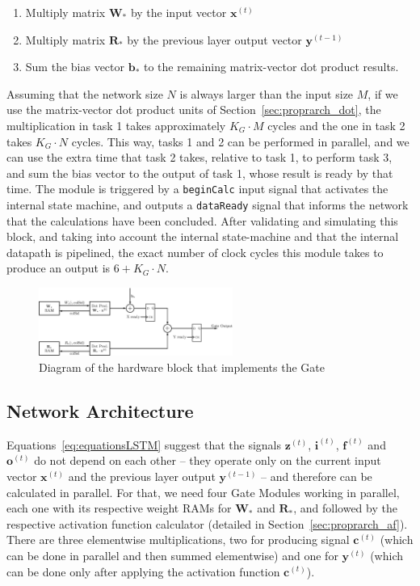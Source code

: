 \documentclass{IEEEtran}
\newcommand{\mb}[1]{\mathbf{#1}}
\begin{document}
\begin{enumerate}
    \item Multiply matrix $\mb{W}_*$ by the input vector $\mb{x}^{(t)}$
    \item Multiply matrix $\mb{R}_*$ by the previous layer output vector $\mb{y}^{(t-1)}$
    \item Sum the bias vector $\mb{b}_*$ to the remaining matrix-vector dot product results.
\end{enumerate}
Assuming that the network size $N$ is always larger than the input size $M$, if we use the matrix-vector dot product units of Section~\ref{sec:proprarch_dot}, the multiplication
in task 1 takes approximately $K_G\cdot M$ cycles and the one in task 2 takes $K_G\cdot N$ cycles. This way, tasks 1 and 2 can be performed in parallel, and we can use the extra
time that task 2 takes, relative to task 1,  to perform task 3, and sum the bias vector to the output of task 1, whose result is ready by that time. The module is triggered by a
\verb+beginCalc+ input signal that activates the internal state machine, and outputs a \verb+dataReady+ signal that informs the network that the calculations have been concluded.
After validating and simulating this block, and taking into account the internal state-machine and that the internal datapath is pipelined, the exact number
of clock cycles this module takes to produce an output is $6+K_G\cdot N$.

\begin{figure}
    \centering
    \includegraphics[width=2.5in]{figures/gate.eps}
    \caption[Diagram of the hardware block that implements the Gate]{Diagram of the hardware block that implements the Gate}
    \label{fig:gate}
\end{figure}

\subsection{Network Architecture}\label{sec:proprarch_net}
Equations~\ref{eq:equationsLSTM} suggest that the signals $\mb{z}^{(t)}$, $\mb{i}^{(t)}$, $\mb{f}^{(t)}$ and $\mb{o}^{(t)}$ do not depend on each other -- they
operate only on the current input vector $\mb{x}^{(t)}$ and the previous layer output $\mb{y}^{(t-1)}$ -- and therefore can be calculated in parallel. For that, we
need four Gate Modules working in parallel, each one with its respective weight RAMs for $\mb{W}_*$ and $\mb{R}_*$, and followed by the respective activation
function calculator (detailed in Section~\ref{sec:proprarch_af}). There are three elementwise multiplications, two for producing signal $\mb{c}^{(t)}$ (which
can be done in parallel and then summed elementwise) and one for $\mb{y}^{(t)}$ (which can be done only after applying the activation function $\mb{c}^{(t)}$).
\end{document}
